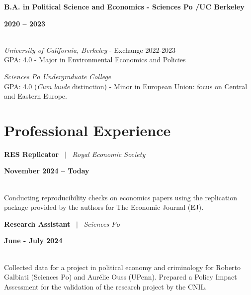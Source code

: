 \documentclass[a4paper,11pt]{article}
\begin{document}
\noindent
\begin{minipage}[t]{0.7\textwidth}
  \textbf{B.A. in Political Science and Economics - Sciences Po /UC Berkeley}
\end{minipage}%
\begin{minipage}[t]{0.3\textwidth}
  \raggedleft \textbf{2020 -- 2023}
\end{minipage}
\\
\textit{University of California, Berkeley} - Exchange 2022-2023 \\
GPA: 4.0  - Major in Environmental Economics and Policies

\textit{Sciences Po Undergraduate College}\\
GPA: 4.0 (\textit{Cum laude} distinction) - Minor in European Union: focus on Central and Eastern Europe.



\section{Professional Experience}

\noindent
\newline
\begin{minipage}[t]{0.7\textwidth}
  \textbf{RES Replicator} \ $|$ \ \textit{Royal Economic Society}
\end{minipage}%
\begin{minipage}[t]{0.3\textwidth}
  \raggedleft \textbf{November 2024 -- Today}
\end{minipage}
\\
Conducting reproducibility checks on economics papers using the replication package provided by the authors for The Economic Journal (EJ).

\noindent
\begin{minipage}[t]{0.7\textwidth}
  \textbf{Research Assistant} \ $|$ \ \textit{Sciences Po}
\end{minipage}%
\begin{minipage}[t]{0.3\textwidth}
  \raggedleft \textbf{June - July 2024}
\end{minipage}
\\
Collected data for a project in political economy and criminology for Roberto Galbiati (Sciences Po) and Aurélie Ouss (UPenn). Prepared a Policy Impact Assessment for the validation of the research project by the CNIL.
\end{document}
